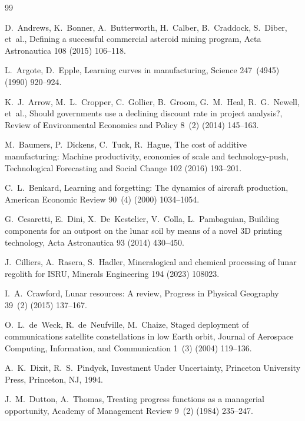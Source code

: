 \documentclass[5p,twocolumn]{elsarticle}
\begin{document}
\begin{thebibliography}{99}

D.~Andrews, K.~Bonner, A.~Butterworth, H.~Calber, B.~Craddock, S.~Diber, et~al.,
\newblock Defining a successful commercial asteroid mining program,
\newblock Acta Astronautica 108 (2015) 106--118.

L.~Argote, D.~Epple,
\newblock Learning curves in manufacturing,
\newblock Science 247~(4945) (1990) 920--924.

K.~J.~Arrow, M.~L.~Cropper, C.~Gollier, B.~Groom, G.~M.~Heal, R.~G.~Newell, et~al.,
\newblock Should governments use a declining discount rate in project analysis?,
\newblock Review of Environmental Economics and Policy 8~(2) (2014) 145--163.

M.~Baumers, P.~Dickens, C.~Tuck, R.~Hague,
\newblock The cost of additive manufacturing: Machine productivity, economies of scale and technology-push,
\newblock Technological Forecasting and Social Change 102 (2016) 193--201.

C.~L.~Benkard,
\newblock Learning and forgetting: The dynamics of aircraft production,
\newblock American Economic Review 90~(4) (2000) 1034--1054.

G.~Cesaretti, E.~Dini, X.~De~Kestelier, V.~Colla, L.~Pambaguian,
\newblock Building components for an outpost on the lunar soil by means of a novel 3D printing technology,
\newblock Acta Astronautica 93 (2014) 430--450.

J.~Cilliers, A.~Rasera, S.~Hadler,
\newblock Mineralogical and chemical processing of lunar regolith for ISRU,
\newblock Minerals Engineering 194 (2023) 108023.

I.~A.~Crawford,
\newblock Lunar resources: A review,
\newblock Progress in Physical Geography 39~(2) (2015) 137--167.

O.~L.~de~Weck, R.~de~Neufville, M.~Chaize,
\newblock Staged deployment of communications satellite constellations in low Earth orbit,
\newblock Journal of Aerospace Computing, Information, and Communication 1~(3) (2004) 119--136.

A.~K.~Dixit, R.~S.~Pindyck,
\newblock Investment Under Uncertainty,
\newblock Princeton University Press, Princeton, NJ, 1994.

J.~M.~Dutton, A.~Thomas,
\newblock Treating progress functions as a managerial opportunity,
\newblock Academy of Management Review 9~(2) (1984) 235--247.


\end{thebibliography}
\end{document}
